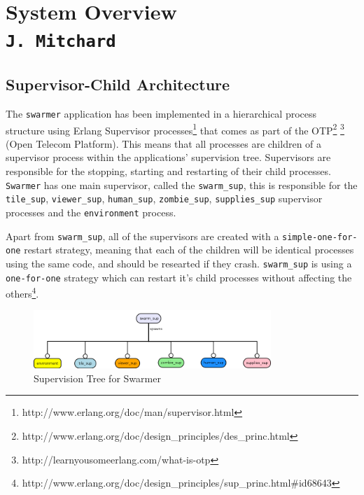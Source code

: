 \pagestyle{empty}
\section{System Overview\\{\small\tt J.~Mitchard}}
\label{system_overview}
\subsection{Supervisor-Child Architecture}
\label{otp_description}
The \verb+swarmer+ application has been implemented in a hierarchical process structure using Erlang Supervisor processes\footnote{http://www.erlang.org/doc/man/supervisor.html} that comes as part of the OTP\footnote{http://www.erlang.org/doc/design\_principles/des\_princ.html} \footnote{http://learnyousomeerlang.com/what-is-otp} (Open Telecom Platform). This means that all processes are children of a supervisor process within the applications' supervision tree. Supervisors are responsible for the stopping, starting and restarting of their child processes.
%
\verb+Swarmer+ has one main supervisor, called the \verb+swarm_sup+, this is responsible for the \verb+tile_sup+, \verb+viewer_sup+, \verb+human_sup+, \verb+zombie_sup+, \verb+supplies_sup+ supervisor processes and the \verb+environment+ process.

Apart from \verb+swarm_sup+, all of the supervisors are created with a \verb+simple-one-for-one+ restart strategy, meaning that each of the children will be identical processes using the same code, and should be researted if they crash. \verb+swarm_sup+ is using a \verb+one-for-one+ strategy which can restart it's child processes without affecting the others\footnote{http://www.erlang.org/doc/design\_principles/sup\_princ.html\#id68643}.

\begin{figure}[h]
  \centering
  \includegraphics[width=0.8\textwidth]{img/supervisor.png}
\caption{Supervision Tree for Swarmer}
    \label{fig:sup_tree}
\end{figure}

